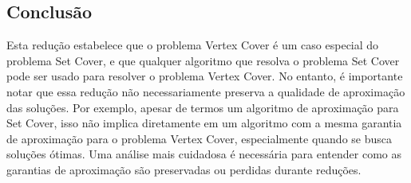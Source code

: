 \documentclass[12pt, a4paper]{report}
\begin{document}
\subsection*{Conclusão}
Esta redução estabelece que o problema Vertex Cover é um caso especial do problema Set Cover, e que qualquer algoritmo que resolva o problema Set Cover pode ser usado para resolver o problema Vertex Cover. No entanto, é importante notar que essa redução não necessariamente preserva a qualidade de aproximação das soluções.
Por exemplo, apesar de termos um algoritmo de aproximação para Set Cover, isso não implica diretamente em um algoritmo com a mesma garantia de aproximação para o problema Vertex Cover, especialmente quando se busca soluções ótimas. Uma análise mais cuidadosa é necessária para entender como as garantias de aproximação são preservadas ou perdidas durante reduções.
\cite{kleinberg2006algorithm}

\newpage
\renewcommand{\refname}{Referências Bibliográficas}

\nocite{*}
\end{document}
